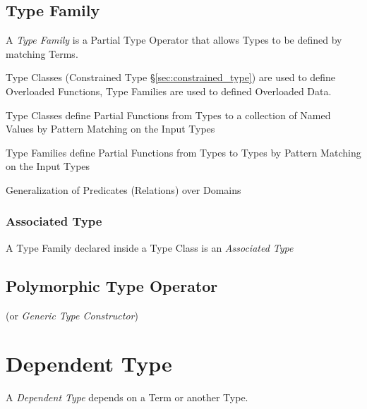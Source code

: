 \subsection{Type Family}\label{sec:type_family}

A \emph{Type Family} is a Partial Type Operator that allows Types to
be defined by matching Terms.


Type Classes (Constrained Type \S\ref{sec:constrained_type}) are used
to define Overloaded Functions, Type Families are used to defined
Overloaded Data.

Type Classes define Partial Functions from Types to a collection of
Named Values by Pattern Matching on the Input Types

Type Families define Partial Functions from Types to Types by Pattern
Matching on the Input Types

Generalization of Predicates (Relations) over Domains



\subsubsection{Associated Type}\label{sec:associated_type}

A Type Family declared inside a Type Class is an \emph{Associated
  Type}



\subsection{Polymorphic Type Operator}
\label{sec:polymorphic_type_operator}

(or \emph{Generic Type Constructor})



\section{Dependent Type}\label{sec:dependent_type}

A \emph{Dependent Type} depends on a Term or another Type.

